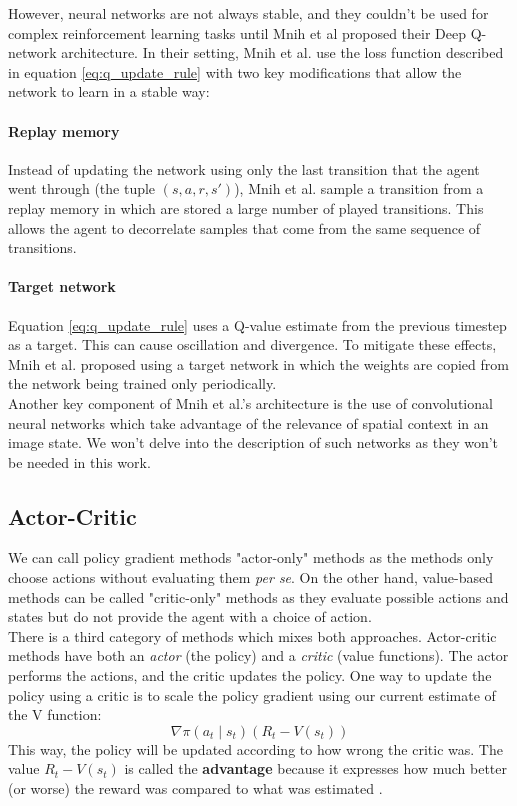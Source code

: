 However, neural networks are not always stable, and they couldn't be used
for complex reinforcement learning tasks until Mnih et al \cite{dqn, dqn_nature}
proposed their Deep Q-network architecture. In their setting, Mnih et al. 
use the loss function described in equation \ref{eq:q_update_rule} with two
key modifications that allow the network to learn in a stable way:

\paragraph{Replay memory} Instead of updating the network using only the 
last transition that the agent went through (the tuple $(s, a, r, s')$), 
Mnih et al. sample a transition from a replay memory in which are stored
a large number of played transitions. This allows the agent to decorrelate
samples that come from the same sequence of transitions.

\paragraph{Target network} Equation \ref{eq:q_update_rule} uses a Q-value
estimate from the previous timestep as a target. This can cause oscillation
and divergence. To mitigate these effects, Mnih et al. proposed using a target
network in which the weights are copied from the network being trained 
only periodically.\\

Another key component of Mnih et al.'s architecture is the use of
convolutional neural networks \cite{convnets} which take advantage of the
relevance of spatial context in an image state. We won't delve into the
description of such networks as they won't be needed in this work.

\subsection{Actor-Critic}
We can call policy gradient methods "actor-only" methods as the methods
only choose actions without evaluating them \textit{per se}. On the other
hand, value-based methods can be called "critic-only" methods as they
evaluate possible actions and states but do not provide the agent
with a choice of action.\\

There is a third category of methods which mixes both approaches. 
Actor-critic methods \cite{suttonbarto} have both an \textit{actor} (the policy) and a
\textit{critic} (value functions). The actor performs the actions, and the 
critic updates the policy. One way to update the policy using a critic is to
scale the policy gradient using our current estimate of the V function:
\begin{equation}
	\label{eq:adv_update_rule}
\nabla \pi(a_t \mid s_t) (R_t - V(s_t))
\end{equation}
This way, the policy will be updated according to how wrong the critic was.
The value $R_t - V(s_t)$ is called the \textbf{advantage} 
because it expresses how much better (or worse) the reward was compared to 
what was estimated \cite{advantage, a3c}.


